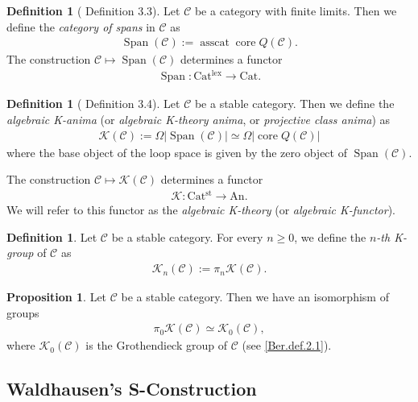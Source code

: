 \documentclass[a4paper,dvipdfmx,11pt,reqno]{amsart}
\newcommand{\C}{\mathcal{C}}
\newcommand{\K}{\mathcal{K}}
\DeclareMathOperator{\core}{core}
\DeclareMathOperator{\asscat}{asscat}
\DeclareMathOperator{\Span}{Span}
\newcommand{\An}{\mathrm{An}}
\newcommand{\Cat}{\mathrm{Cat}}
\newcommand{\Catlex}{\mathrm{Cat^{lex}}}
\newcommand{\Catst}{\mathrm{Cat^{st}}}
\theoremstyle{definition}
\newtheorem{definition}[theorem]{Definition}
\newtheorem{proposition}[theorem]{Proposition}
\begin{document}
\begin{definition}[\cite{HLS23} Definition 3.3] \label{HLS23.def.3.3}
  Let $\C$ be a category with finite limits.
  Then we define the \textit{category of spans} in $\C$ as 
  \begin{align*}
    \Span(\C) := \asscat \core Q(\C).
  \end{align*}
  The construction $\C \mapsto \Span(\C)$ determines a functor 
  \begin{align*}
    \Span : \Catlex \to \Cat.
  \end{align*}
\end{definition}

\begin{definition}[\cite{HLS23} Definition 3.4] \label{HLS23.def.3.4}
  Let $\C$ be a stable category.
  Then we define the \textit{algebraic K-anima} (or \textit{algebraic K-theory anima}, or \textit{projective class anima}) as 
  \begin{align*}
    \K(\C) := \Omega|\Span(\C)| \simeq \Omega|\core Q(\C)|
  \end{align*}
  where the base object of the loop space is given by the zero object of $\Span(\C)$.

  The construction $\C \mapsto \K(\C)$ determines a functor 
  \begin{align*}
    \K : \Catst \to \An. 
  \end{align*}
  We will refer to this functor as the \textit{algebraic K-theory} (or \textit{algebraic K-functor}).
\end{definition}

\begin{definition}
  Let $\C$ be a stable category.
  For every $n \geq 0$, we define the \textit{$n$-th K-group} of $\C$ as 
  \begin{align*}
    \K_n(\C) := \pi_n\K(\C).
  \end{align*}
\end{definition}

\begin{proposition}
  Let $\C$ be a stable category.
  Then we have an isomorphism of groups
  \begin{align*}
    \pi_0\K(\C) \simeq \K_0(\C),
  \end{align*}
  where $\K_0(\C)$ is the Grothendieck group of $\C$ (see \cref{Ber.def.2.1}).
\end{proposition}

\subsection{Waldhausen's S-Construction}
\end{document}
